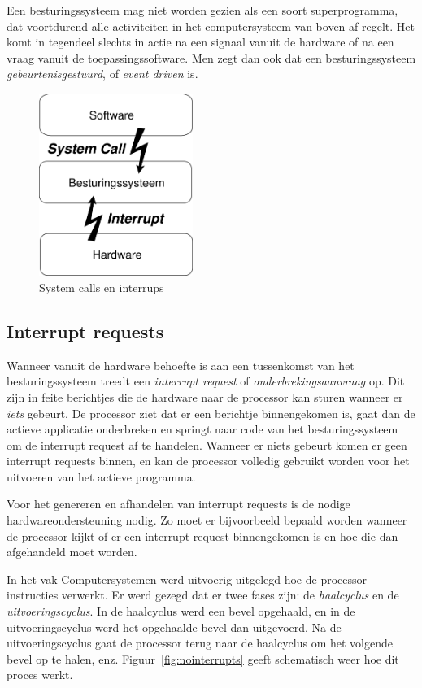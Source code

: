Een besturingssysteem mag niet worden gezien als een soort
superprogramma, dat voortdurend alle activiteiten in het computersysteem
van boven af regelt. Het komt in tegendeel slechts in actie na een
signaal vanuit de hardware of na een vraag vanuit de toepassingssoftware.
Men zegt dan ook dat een besturingssysteem \emph{gebeurtenisgestuurd},
of \emph{event driven} is.

\begin{figure}
\begin{center}
\includegraphics[width=50mm]{images/fig0201.png}
\end{center}
\caption{System calls en interrups}
\label{sysint}
\end{figure}

\subsection{Interrupt requests}

Wanneer vanuit de hardware behoefte is aan een tussenkomst van
het besturingssysteem treedt een \emph{interrupt request} of
\emph{onderbrekingsaanvraag} op. Dit zijn in feite berichtjes die de hardware naar de processor kan sturen wanneer er \emph{iets} gebeurt. De processor ziet dat er een berichtje binnengekomen is, gaat dan de actieve applicatie onderbreken en springt naar code van het besturingssysteem om de interrupt request af te handelen. Wanneer er niets gebeurt komen er geen interrupt requests binnen, en kan de processor volledig gebruikt worden voor het uitvoeren van het actieve programma.

Voor het genereren en afhandelen van interrupt requests is de nodige hardwareondersteuning nodig. Zo moet er bijvoorbeeld bepaald worden wanneer de processor kijkt of er een interrupt request binnengekomen is en hoe die dan afgehandeld moet worden.

In het vak Computersystemen werd uitvoerig uitgelegd hoe de processor instructies verwerkt. Er werd gezegd dat er twee fases zijn: de \emph{haalcyclus} en de \emph{uitvoeringscyclus}. In de haalcyclus werd een bevel opgehaald, en in de uitvoeringscyclus werd het opgehaalde bevel dan uitgevoerd. Na de uitvoeringscyclus gaat de processor terug naar de haalcyclus om het volgende bevel op te halen, enz. Figuur~\ref{fig:nointerrupts} geeft schematisch weer hoe dit proces werkt.

